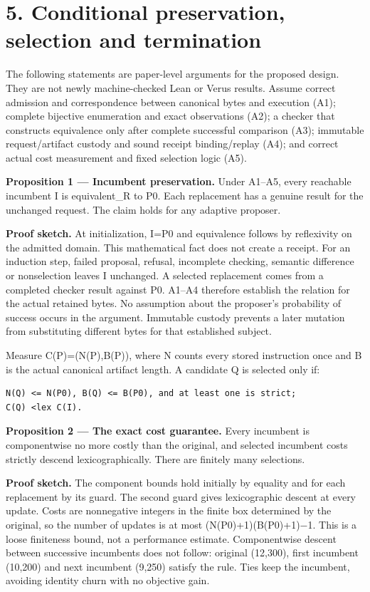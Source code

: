 \documentclass[11pt]{article}
\begin{document}
\section{5. Conditional preservation, selection and termination}

The following statements are paper-level arguments for the proposed design. They are not newly machine-checked Lean or Verus results. Assume correct admission and correspondence between canonical bytes and execution (A1); complete bijective enumeration and exact observations (A2); a checker that constructs equivalence only after complete successful comparison (A3); immutable request/artifact custody and sound receipt binding/replay (A4); and correct actual cost measurement and fixed selection logic (A5).

\textbf{Proposition 1 --- Incumbent preservation.} Under A1--A5, every reachable incumbent I is equivalent\_R to P0. Each replacement has a genuine result for the unchanged request. The claim holds for any adaptive proposer.

\textbf{Proof sketch.} At initialization, I=P0 and equivalence follows by reflexivity on the admitted domain. This mathematical fact does not create a receipt. For an induction step, failed proposal, refusal, incomplete checking, semantic difference or nonselection leaves I unchanged. A selected replacement comes from a completed checker result against P0. A1--A4 therefore establish the relation for the actual retained bytes. No assumption about the proposer's probability of success occurs in the argument. Immutable custody prevents a later mutation from substituting different bytes for that established subject.

Measure C(P)=(N(P),B(P)), where N counts every stored instruction once and B is the actual canonical artifact length. A candidate Q is selected only if:

\begin{small}
\begin{verbatim}
N(Q) <= N(P0), B(Q) <= B(P0), and at least one is strict;
C(Q) <lex C(I).
\end{verbatim}
\end{small}

\textbf{Proposition 2 --- The exact cost guarantee.} Every incumbent is componentwise no more costly than the original, and selected incumbent costs strictly descend lexicographically. There are finitely many selections.

\textbf{Proof sketch.} The component bounds hold initially by equality and for each replacement by its guard. The second guard gives lexicographic descent at every update. Costs are nonnegative integers in the finite box determined by the original, so the number of updates is at most (N(P0)+1)(B(P0)+1)\ensuremath{-}1. This is a loose finiteness bound, not a performance estimate. Componentwise descent between successive incumbents does not follow: original (12,300), first incumbent (10,200) and next incumbent (9,250) satisfy the rule. Ties keep the incumbent, avoiding identity churn with no objective gain.
\end{document}
